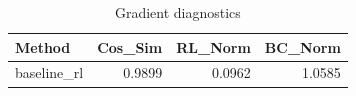 \begin{table}[htbp]
\centering
\caption{Gradient diagnostics}
\label{tab:grad-diag}
\begin{tabular}{lrrr}
\toprule
\textbf{Method} & \textbf{Cos\_Sim} & \textbf{RL\_Norm} & \textbf{BC\_Norm} \\
\midrule
baseline\_rl & 0.9899 & 0.0962 & 1.0585 \\
\bottomrule
\end{tabular}
\end{table}
